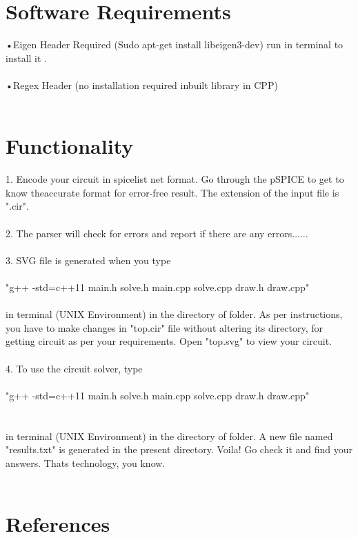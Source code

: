\documentclass{scrreprt}
\begin{document}
\section{Software Requirements}
$ $\indent  •Eigen Header Required (Sudo apt-get install libeigen3-dev) run in terminal to \indent install it .\\
\\
\indent •Regex Header (no installation required inbuilt library in CPP)\\
\\
$ $
\section{Functionality}
$ $
\\ 1. Encode your circuit in spicelist net format. Go through the pSPICE to get to know theaccurate format for error-free result. The extension of the input file is ".cir". \\
\\
 2. The parser will check for errors and report if there are any errors......\\
\\
 3. SVG file is generated when you type \\
\\
\indent "g++ -std=c++11 main.h solve.h  main.cpp  solve.cpp draw.h draw.cpp" \\
\\
in terminal (UNIX Environment) in the directory of folder. As per instructions, you have to make changes in "top.cir" file without altering its directory, for getting circuit as per your requirements. Open "top.svg" to view your circuit.
\\
\\
 4. To use the circuit solver, type\\
\\
\indent "g++ -std=c++11 main.h solve.h  main.cpp  solve.cpp draw.h draw.cpp" \\
\\
\\in terminal (UNIX Environment) in the directory of folder. A new file named "results.txt" is generated in the present directory. Voila! Go check it and find your answers. Thats technology, you know.
\\
\\
\section{References}
\end{document}
